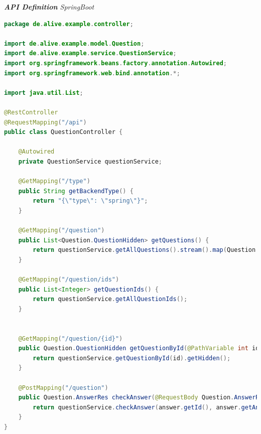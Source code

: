 \documentclass[biblatex]{lni}
\begin{document}
\textit{\textbf{API Definition} SpringBoot} \\
\begin{lstlisting}[caption={QuestionController.java}, label=api-sp, language=java]
package de.alive.example.controller;

import de.alive.example.model.Question;
import de.alive.example.service.QuestionService;
import org.springframework.beans.factory.annotation.Autowired;
import org.springframework.web.bind.annotation.*;

import java.util.List;

@RestController
@RequestMapping("/api")
public class QuestionController {

    @Autowired
    private QuestionService questionService;

    @GetMapping("/type")
    public String getBackendType() {
        return "{\"type\": \"spring\"}";
    }

    @GetMapping("/question")
    public List<Question.QuestionHidden> getQuestions() {
        return questionService.getAllQuestions().stream().map(Question::getHidden).toList();
    }

    @GetMapping("/question/ids")
    public List<Integer> getQuestionIds() {
        return questionService.getAllQuestionIds();
    }


    @GetMapping("/question/{id}")
    public Question.QuestionHidden getQuestionById(@PathVariable int id) {
        return questionService.getQuestionById(id).getHidden();
    }

    @PostMapping("/question")
    public Question.AnswerRes checkAnswer(@RequestBody Question.AnswerReq answer) {
        return questionService.checkAnswer(answer.getId(), answer.getAnswer());
    }
}
\end{lstlisting}
\end{document}
